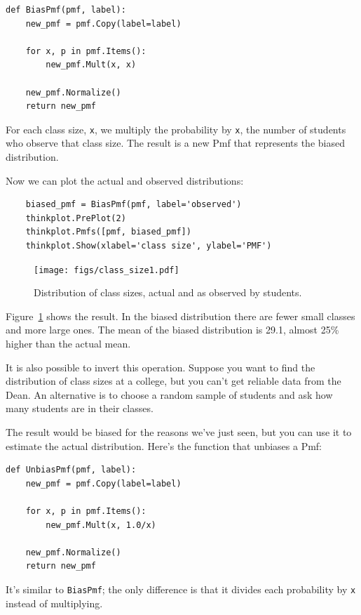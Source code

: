 \documentclass[12pt]{book}
\theoremstyle{exercise}
\begin{document}
\begin{verbatim}
def BiasPmf(pmf, label):
    new_pmf = pmf.Copy(label=label)

    for x, p in pmf.Items():
        new_pmf.Mult(x, x)
        
    new_pmf.Normalize()
    return new_pmf
\end{verbatim}

For each class size, {\tt x}, we multiply the probability by
{\tt x}, the number of students who observe that class size.
The result is a new Pmf that represents the biased distribution.

Now we can plot the actual and observed distributions:%

\begin{verbatim}
    biased_pmf = BiasPmf(pmf, label='observed')
    thinkplot.PrePlot(2)
    thinkplot.Pmfs([pmf, biased_pmf])
    thinkplot.Show(xlabel='class size', ylabel='PMF')
\end{verbatim}

\begin{figure}
\centerline{\texttt{[image: figs/class\_size1.pdf]}}
\caption{Distribution of class sizes, actual and as observed by students.}%
\label{class_size1}
\end{figure}

Figure~\ref{class_size1} shows the result.  In the biased distribution
there are fewer small classes and more large ones.
The mean of the biased distribution is 29.1, almost 25\% higher
than the actual mean.

It is also possible to invert this operation.  Suppose you want to
find the distribution of class sizes at a college, but you can't get
reliable data from the Dean.  An alternative is to choose a random
sample of students and ask how many students are in their
classes.%
%

The result would be biased for the reasons we've just seen, but you
can use it to estimate the actual distribution.  Here's the function
that unbiases a Pmf:

\begin{verbatim}
def UnbiasPmf(pmf, label):
    new_pmf = pmf.Copy(label=label)

    for x, p in pmf.Items():
        new_pmf.Mult(x, 1.0/x)
        
    new_pmf.Normalize()
    return new_pmf
\end{verbatim}

It's similar to {\tt BiasPmf}; the only difference is that it
divides each probability by {\tt x} instead of multiplying.
\end{document}
